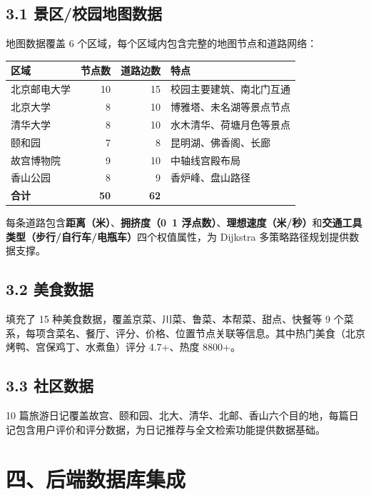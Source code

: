 \documentclass[12pt,a4paper]{article}
\begin{document}
\subsection*{3.1 景区/校园地图数据}

地图数据覆盖 6 个区域，每个区域内包含完整的地图节点和道路网络：

\begin{center}
\begin{tabular}{l r r l}
    \toprule
    \bfseries 区域 & \bfseries 节点数 & \bfseries 道路边数 & \bfseries 特点 \\
    \midrule
    北京邮电大学 & 10 & 15 & 校园主要建筑、南北门互通 \\
    北京大学 & 8 & 10 & 博雅塔、未名湖等景点节点 \\
    清华大学 & 8 & 10 & 水木清华、荷塘月色等景点 \\
    颐和园 & 7 & 8 & 昆明湖、佛香阁、长廊 \\
    故宫博物院 & 9 & 10 & 中轴线宫殿布局 \\
    香山公园 & 8 & 9 & 香炉峰、盘山路径 \\
    \midrule
    \textbf{合计} & \textbf{50} & \textbf{62} & \\
    \bottomrule
\end{tabular}
\end{center}

每条道路包含\textbf{距离（米）}、\textbf{拥挤度（0~1 浮点数）}、\textbf{理想速度（米/秒）}和\textbf{交通工具类型（步行/自行车/电瓶车）}四个权值属性，为 Dijkstra 多策略路径规划提供数据支撑。

\subsection*{3.2 美食数据}

填充了 15 种美食数据，覆盖京菜、川菜、鲁菜、本帮菜、甜点、快餐等 9 个菜系，每项含菜名、餐厅、评分、价格、位置节点关联等信息。其中热门美食（北京烤鸭、宫保鸡丁、水煮鱼）评分 4.7+、热度 8800+。

\subsection*{3.3 社区数据}

10 篇旅游日记覆盖故宫、颐和园、北大、清华、北邮、香山六个目的地，每篇日记包含用户评价和评分数据，为日记推荐与全文检索功能提供数据基础。

\section*{四、后端数据库集成}
\end{document}
